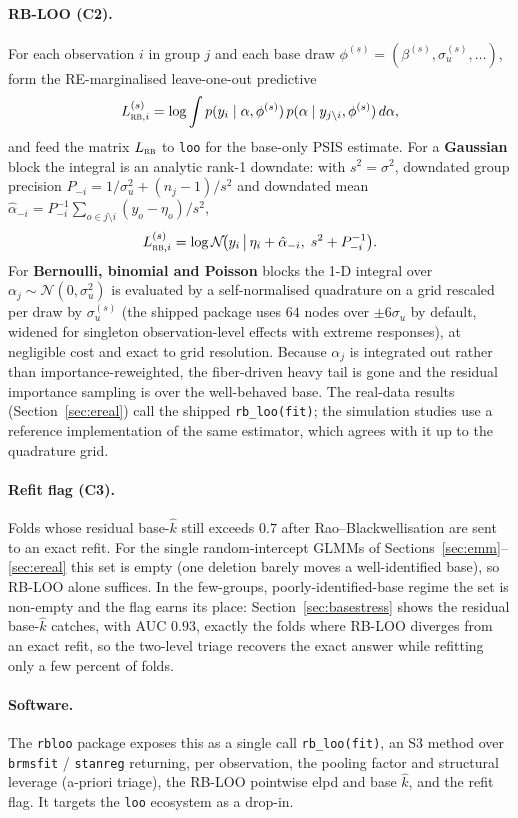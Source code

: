 \documentclass[11pt]{article}
\newcommand{\khat}{\hat{k}}
\newcommand{\N}{\mathcal{N}}
\newcommand{\RB}{\textsc{rb}}
\begin{document}
\paragraph{RB-LOO (C2).} For each observation $i$ in group $j$ and each base draw
$\phi^{(s)} = (\beta^{(s)}, \sigma_u^{(s)}, \dots)$, form the RE-marginalised
leave-one-out predictive
\[
L^{(s)}_{\RB,i} = \log \int p(y_i \mid \alpha, \phi^{(s)})\,
p(\alpha \mid y_{j\setminus i}, \phi^{(s)})\, d\alpha,
\]
and feed the matrix $L_{\RB}$ to \texttt{loo} for the base-only PSIS estimate. For
a \textbf{Gaussian} block the integral is an analytic rank-1 downdate: with
$s^2=\sigma^2$, downdated group precision $P_{-i}=1/\sigma_u^2 + (n_j-1)/s^2$ and
downdated mean $\hat\alpha_{-i} = P_{-i}^{-1}\sum_{o\in j\setminus i}(y_o-\eta_o)/s^2$,
\[
L^{(s)}_{\RB,i} = \log \N\!\big(y_i \,\big|\, \eta_i + \hat\alpha_{-i},\; s^2 + P_{-i}^{-1}\big).
\]
For \textbf{Bernoulli, binomial and Poisson} blocks the 1-D integral over
$\alpha_j\sim\N(0,\sigma_u^2)$ is evaluated by a self-normalised quadrature on a
grid rescaled per draw by $\sigma_u^{(s)}$ (the shipped package uses $64$ nodes over
$\pm 6\sigma_u$ by default, widened for singleton observation-level effects with
extreme responses), at negligible cost and exact to grid resolution. Because
$\alpha_j$ is integrated out rather than importance-reweighted, the fiber-driven
heavy tail is gone and the residual importance sampling is over the well-behaved
base. The real-data results (Section~\ref{sec:ereal}) call the shipped
\texttt{rb\_loo(fit)}; the simulation studies use a reference implementation of the
same estimator, which agrees with it up to the quadrature grid.

\paragraph{Refit flag (C3).} Folds whose residual base-$\khat$ still exceeds $0.7$
after Rao--Blackwellisation are sent to an exact refit. For the single
random-intercept GLMMs of Sections~\ref{sec:emm}--\ref{sec:ereal} this set is
empty (one deletion barely moves a well-identified base), so RB-LOO alone
suffices. In the few-groups, poorly-identified-base regime the set is non-empty and
the flag earns its place: Section~\ref{sec:basestress} shows the residual
base-$\khat$ catches, with AUC $0.93$, exactly the folds where RB-LOO diverges from
an exact refit, so the two-level triage recovers the exact answer while refitting
only a few percent of folds.

\paragraph{Software.} The \texttt{rbloo} package exposes this as a single call
\texttt{rb\_loo(fit)}, an S3 method over \texttt{brmsfit} / \texttt{stanreg}
returning, per observation, the pooling factor and structural leverage (a-priori
triage), the RB-LOO pointwise elpd and base $\khat$, and the refit flag. It
targets the \texttt{loo} ecosystem as a drop-in.
\end{document}
